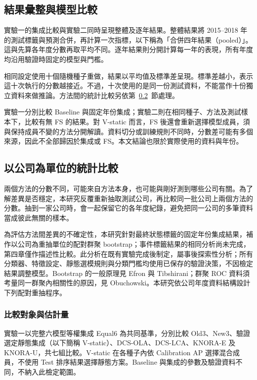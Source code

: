\subsection{結果彙整與模型比較}

實驗一的集成比較與實驗二同時呈現整體及逐年結果。整體結果將 2015--2018 年的測試標籤與預測合併，再計算一次指標，以下稱為「合併四年結果（pooled）」。這與先算各年度分數再取平均不同。逐年結果則分開計算每一年的表現，所有年度均沿用驗證時固定的模型與門檻。

相同設定使用十個隨機種子重做，結果以平均值及標準差呈現。標準差越小，表示這十次執行的分數越接近。不過，十次使用的是同一份測試資料，不能當作十份獨立資料來做推論。方法間的統計比較另依第~\ref{sec:method-statistics}~節處理。

實驗一分別比較 Baseline 與固定年份集成；實驗二則在相同種子、方法及測試樣本下，比較有無 FS 的結果。對 V-static 而言，FS 後還會重新選擇模型成員，須與保持成員不變的方法分開解讀。資料切分或訓練規則不同時，分數差可能有多個來源，因此不全部歸因於集成或 FS。本文結論也限於實際使用的資料與年份。

\subsection{以公司為單位的統計比較}\label{sec:method-statistics}

兩個方法的分數不同，可能來自方法本身，也可能與剛好測到哪些公司有關。為了解差異是否穩定，本研究反覆重新抽取測試公司，再比較同一批公司上兩個方法的分數。抽到一家公司時，會一起保留它的各年度紀錄，避免把同一公司的多筆資料當成彼此無關的樣本。

為評估方法間差異的不確定性，本研究針對最終狀態標籤的固定年份集成結果，補作以公司為重抽單位的配對群聚 bootstrap；事件標籤結果的相同分析尚未完成，第四章僅作描述性比較。此分析在既有實驗完成後制定，屬事後探索性分析；所有分類器、特徵設定、靜態選模規則與分類門檻均使用已保存的驗證決策，不因檢定結果調整模型。Bootstrap 的一般原理見 Efron 與 Tibshirani\autocite{efron1986bootstrap}；群聚 ROC 資料須考量同一群聚內相關性的原因，見 Obuchowski\autocite{obuchowski1997clustered}。本研究依公司年度資料結構設計下列配對重抽程序。

\subsubsection{比較對象與估計量}

實驗一以完整六模型等權集成 Equal6 為共同基準，分別比較 Old3、New3、驗證選定靜態集成（以下簡稱 V-static）、DCS-OLA、DCS-LCA、KNORA-E 及 KNORA-U，共七組比較。V-static 在各種子內依 Calibration AP 選擇混合成員，不使用 Test 排序結果選擇靜態方案。Baseline 與集成的參數及驗證資料不同，不納入此檢定範圍。

